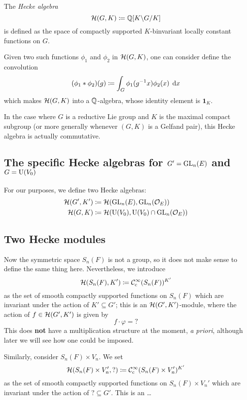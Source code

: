 \begin{definition}
  The \emph{Hecke algebra}
  \[ \mathcal H(G, K) \coloneqq \mathbb Q[K \backslash G \slash K] \]
  is defined as the space of compactly supported $K$-binvariant
  locally constant functions on $G$.

  Given two such functions $\phi_1$ and $\phi_2$ in $\mathcal H(G,K)$,
  one can consider define the convolution
  \[ (\phi_1 \ast \phi_2)(g) \coloneqq \int_G \phi_1(g\inv x) \phi_2(x) \; \odif x \]
  which makes $\mathcal H(G, K)$ into a $\mathbb Q$-algebra,
  whose identity element is $\mathbf{1}_K$.
\end{definition}
In the case where $G$ is a reductive Lie group and
$K$ is the maximal compact subgroup
(or more generally whenever $(G,K)$ is a Gelfand pair),
this Hecke algebra is actually commutative.

\subsection{The specific Hecke algebras for $G' = \operatorname{GL}_n(E)$ and $G = \operatorname{U}(V_0)$}
For our purposes, we define two Hecke algebras:
\begin{align*}
  \mathcal H(G', K') &\coloneqq \mathcal H(\operatorname{GL}_n(E), \operatorname{GL}_n(\mathcal O_E)) \\
  \mathcal H(G, K) &\coloneqq \mathcal H(\operatorname{U}(V_0), \operatorname{U}(V_0) \cap \operatorname{GL}_n(\mathcal O_E))
\end{align*}

\subsection{Two Hecke modules}
Now the symmetric space $S_n(F)$ is not a group,
so it does not make sense to define the same thing here.
Nevertheless, we introduce
\[ \mathcal H(S_n(F), K') \coloneqq \mathcal C_{\mathrm{c}}^{\infty}(S_n(F))^{K'} \]
as the set of smooth compactly supported functions on $S_n(F)$
which are invariant under the action of $K' \subseteq G'$;
this is an $\mathcal H(G', K')$-module, where the action of $f \in \mathcal H(G', K')$ is given by
\[ f \cdot \varphi = {?} \]
This does \textbf{not} have a multiplication structure at the moment, \emph{a priori},
although later we will see how one could be imposed.

Similarly, consider $S_n(F) \times V_n$.
We set
\[ \mathcal H(S_n(F) \times V_n', {?}) \coloneqq \mathcal C_{\mathrm{c}}^{\infty}(S_n(F) \times V_n')^{K'} \]
as the set of smooth compactly supported functions on $S_n(F) \times V_n'$
which are invariant under the action of ${?} \subseteq G'$.
This is an \dots

